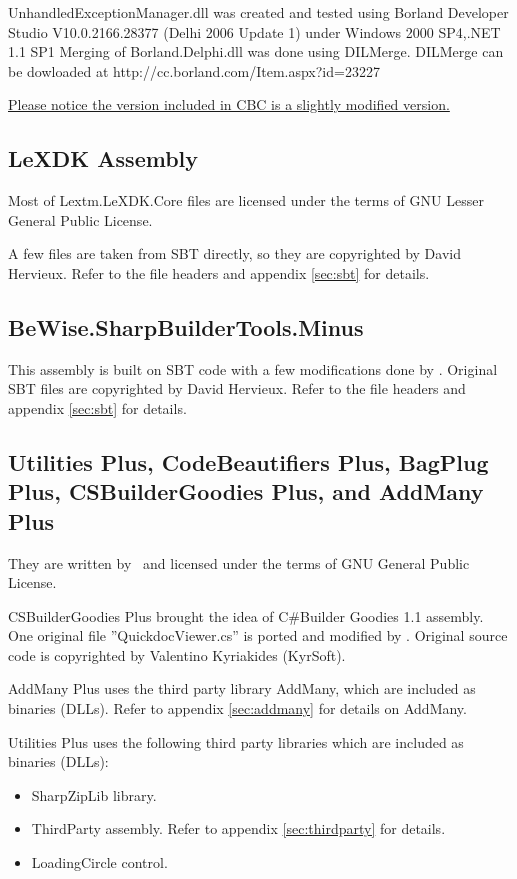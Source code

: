 \documentclass{article}
\begin{document}
UnhandledExceptionManager.dll was created and tested using Borland Developer
Studio V10.0.2166.28377 (Delhi 2006 Update 1) under Windows 2000 SP4,.NET 1.1
SP1 Merging of Borland.Delphi.dll was done using DILMerge. DILMerge can be
dowloaded at http://cc.borland.com/Item.aspx?id=23227

\underline{Please notice the version included in CBC is a slightly modified version.}

\subsection{LeXDK Assembly}
Most of Le\-xtm.Le\-XDK.Co\-re files are licensed under the terms of GNU Lesser General Public
License.

A few files are taken from SBT directly, so they are copyrighted by David
Hervieux. Refer to the file headers and appendix \ref{sec:sbt} for
details.

\subsection{BeWise.SharpBuilderTools.Minus}
This assembly is built on SBT code with a few modifications done by \lextm.
Original SBT files are copyrighted by David Hervieux. Refer to the file headers and
appendix \ref{sec:sbt} for details.

\subsection{Utilities Plus, CodeBeautifiers Plus, BagPlug Plus, CSBuilderGoodies
Plus, and AddMany Plus}
They are written by \lextm\ and licensed under the terms of GNU General Public
License.

CSBuilderGoodies Plus brought the idea of C\#Builder Goodies 1.1 assembly. One
original file ''QuickdocViewer.cs'' is ported and modified by \lextm.
Original source code is copyrighted by Valentino Kyriakides (KyrSoft).

AddMany Plus uses the third party library AddMany, which are included as
binaries (DLLs). Refer to appendix \ref{sec:addmany} for details on AddMany.

Utilities Plus uses the following third party libraries which are included as
binaries (DLLs):

\begin{itemize}

  \item SharpZipLib library.

  \item ThirdParty assembly. Refer to appendix \ref{sec:thirdparty} for details.


  \item LoadingCircle control.

\end{itemize}
\end{document}
